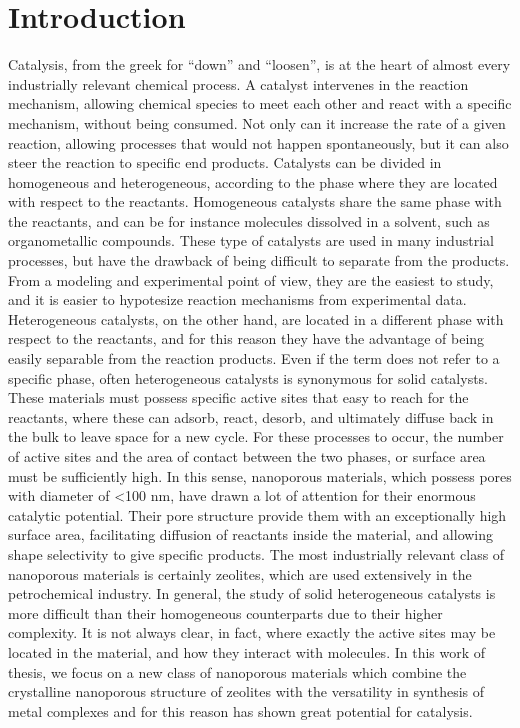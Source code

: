 \graphicspath{{figures/}}

\renewcommand\evenpagerightmark{{\scshape\small Introduction}}
\renewcommand\oddpageleftmark{{\scshape\small Chapter 1}}


\hyphenation{}

\chapter[Introduction]%
{Introduction}
\label{ch1}

Catalysis, from the greek for ``down'' and ``loosen'', is at the heart of almost every industrially relevant chemical process. A catalyst intervenes in the reaction mechanism, allowing chemical species to meet each other and react with a specific mechanism, without being consumed. Not only can it increase the rate of a given reaction, allowing processes that would not happen spontaneously, but it can also steer the reaction to specific end products. Catalysts can be divided in homogeneous and heterogeneous, according to the phase where they are located with respect to the reactants. Homogeneous catalysts share the same phase with the reactants, and can be for instance molecules dissolved in a solvent, such as organometallic compounds. These type of catalysts are used in many industrial processes,  but have the drawback of being difficult to separate from the products. From a modeling and experimental point of view, they are the easiest to study, and it is easier to hypotesize reaction mechanisms from experimental data. Heterogeneous catalysts, on the other hand, are located in a different phase with respect to the reactants, and for this reason they have the advantage of being easily separable from the reaction products. Even if the term does not refer to a specific phase, often heterogeneous catalysts is synonymous for solid catalysts. These materials must possess specific active sites that easy to reach for the reactants, where these can adsorb, react, desorb, and ultimately diffuse back in the bulk to leave space for a new cycle. For these processes to occur, the number of active sites and the area of contact between the two phases, or surface area must be sufficiently high. In this sense, nanoporous materials, which possess pores with diameter of <100 nm, have drawn a lot of attention for their enormous catalytic potential. Their pore structure provide them with an exceptionally high surface area, facilitating diffusion of reactants inside the material, and allowing shape selectivity to give specific products. The most industrially relevant class of nanoporous materials is certainly zeolites, which are used extensively in the petrochemical industry. In general, the study of solid heterogeneous catalysts is more difficult than their homogeneous counterparts due to their higher complexity. It is not always clear, in fact, where exactly the active sites may be located in the material, and how they interact with molecules. In this work of thesis, we focus on a new class of nanoporous materials which combine the crystalline nanoporous structure of zeolites with the versatility in synthesis of metal complexes and for this reason has shown great potential for catalysis.

